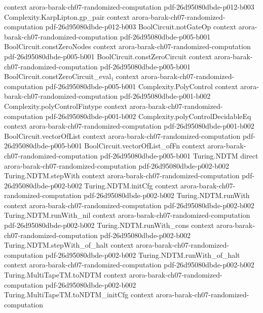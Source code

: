 \begin{theorem}
  {context}
  {arora-barak-ch07-randomized-computation}
  {pdf-26d95080dbde-p012-b003}
\proofstep
  {Complexity.KarpLipton.gp_pair}
  {context}
  {arora-barak-ch07-randomized-computation}
  {pdf-26d95080dbde-p012-b003}
\proofstep
  {BoolCircuit.notGateOp}
  {context}
  {arora-barak-ch07-randomized-computation}
  {pdf-26d95080dbde-p005-b001}
\proofstep
  {BoolCircuit.constZeroNodes}
  {context}
  {arora-barak-ch07-randomized-computation}
  {pdf-26d95080dbde-p005-b001}
\proofstep
  {BoolCircuit.constZeroCircuit}
  {context}
  {arora-barak-ch07-randomized-computation}
  {pdf-26d95080dbde-p005-b001}
\proofstep
  {BoolCircuit.constZeroCircuit_eval₁}
  {context}
  {arora-barak-ch07-randomized-computation}
  {pdf-26d95080dbde-p005-b001}
\proofstep
  {Complexity.PolyControl}
  {context}
  {arora-barak-ch07-randomized-computation}
  {pdf-26d95080dbde-p001-b002}
\proofstep
  {Complexity.polyControlFintype}
  {context}
  {arora-barak-ch07-randomized-computation}
  {pdf-26d95080dbde-p001-b002}
\proofstep
  {Complexity.polyControlDecidableEq}
  {context}
  {arora-barak-ch07-randomized-computation}
  {pdf-26d95080dbde-p001-b002}
\proofstep
  {BoolCircuit.vectorOfList}
  {context}
  {arora-barak-ch07-randomized-computation}
  {pdf-26d95080dbde-p005-b001}
\proofstep
  {BoolCircuit.vectorOfList_ofFn}
  {context}
  {arora-barak-ch07-randomized-computation}
  {pdf-26d95080dbde-p005-b001}
\proofstep
  {Turing.NDTM}
  {direct}
  {arora-barak-ch07-randomized-computation}
  {pdf-26d95080dbde-p002-b002}
\proofstep
  {Turing.NDTM.stepWith}
  {context}
  {arora-barak-ch07-randomized-computation}
  {pdf-26d95080dbde-p002-b002}
\proofstep
  {Turing.NDTM.initCfg}
  {context}
  {arora-barak-ch07-randomized-computation}
  {pdf-26d95080dbde-p002-b002}
\proofstep
  {Turing.NDTM.runWith}
  {context}
  {arora-barak-ch07-randomized-computation}
  {pdf-26d95080dbde-p002-b002}
\proofstep
  {Turing.NDTM.runWith_nil}
  {context}
  {arora-barak-ch07-randomized-computation}
  {pdf-26d95080dbde-p002-b002}
\proofstep
  {Turing.NDTM.runWith_cons}
  {context}
  {arora-barak-ch07-randomized-computation}
  {pdf-26d95080dbde-p002-b002}
\proofstep
  {Turing.NDTM.stepWith_of_halt}
  {context}
  {arora-barak-ch07-randomized-computation}
  {pdf-26d95080dbde-p002-b002}
\proofstep
  {Turing.NDTM.runWith_of_halt}
  {context}
  {arora-barak-ch07-randomized-computation}
  {pdf-26d95080dbde-p002-b002}
\proofstep
  {Turing.MultiTapeTM.toNDTM}
  {context}
  {arora-barak-ch07-randomized-computation}
  {pdf-26d95080dbde-p002-b002}
\proofstep
  {Turing.MultiTapeTM.toNDTM_initCfg}
  {context}
  {arora-barak-ch07-randomized-computation}

\end{theorem}
